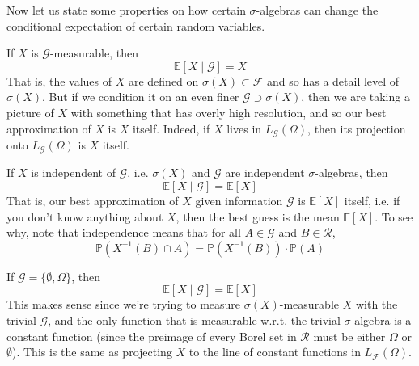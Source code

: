 \documentclass{article}
\begin{document}
    Now let us state some properties on how certain $\sigma$-algebras can change the conditional expectation of certain random variables. 

    \begin{theorem}
      If $X$ is $\mathcal{G}$-measurable, then 
      \begin{equation}
        \mathbb{E}[X \mid \mathcal{G}] = X
      \end{equation}
      That is, the values of $X$ are defined on $\sigma(X) \subset \mathcal{F}$ and so has a detail level of $\sigma(X)$. But if we condition it on an even finer $\mathcal{G} \supset \sigma(X)$, then we are taking a picture of $X$ with something that has overly high resolution, and so our best approximation of $X$ is $X$ itself. Indeed, if $X$ lives in $L_\mathcal{G} (\Omega)$, then its projection onto $L_\mathcal{G} (\Omega)$ is $X$ itself. 
    \end{theorem}

    \begin{theorem}
      If $X$ is independent of $\mathcal{G}$, i.e. $\sigma(X)$ and $\mathcal{G}$ are independent $\sigma$-algebras, then 
      \begin{equation}
        \mathbb{E}[X \mid \mathcal{G}] = \mathbb{E}[X]
      \end{equation}
      That is, our best approximation of $X$ given information $\mathcal{G}$ is $\mathbb{E}[X]$ itself, i.e. if you don't know anything about $X$, then the best guess is the mean $\mathbb{E}[X]$. To see why, note that independence means that for all $A \in \mathcal{G}$ and $B \in \mathcal{R}$, 
      \begin{equation}
        \mathbb{P}(X^{-1} (B) \cap A) = \mathbb{P}(X^{-1}(B)) \cdot \mathbb{P}(A)
      \end{equation}
    \end{theorem}

    \begin{theorem}
      If $\mathcal{G} = \{\emptyset, \Omega\}$, then 
      \begin{equation}
        \mathbb{E}[X \mid \mathcal{G}] = \mathbb{E}[X]
      \end{equation}
      This makes sense since we're trying to measure $\sigma(X)$-measurable $X$ with the trivial $\mathcal{G}$, and the only function that is measurable w.r.t. the trivial $\sigma$-algebra is a constant function (since the preimage of every Borel set in $\mathcal{R}$ must be either $\Omega$ or $\emptyset$). This is the same as projecting $X$ to the line of constant functions in $L_\mathcal{F}(\Omega)$. 
    \end{theorem}
\end{document}
